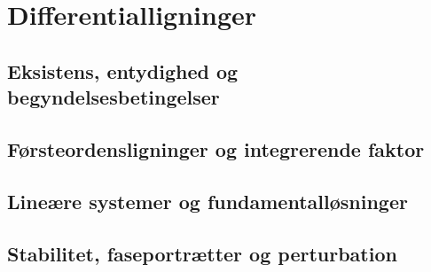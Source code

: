 \chapter{Differentialligninger}
\section{Eksistens, entydighed og begyndelsesbetingelser}
\leavevmode\par

\section{Førsteordensligninger og integrerende faktor}
\leavevmode\par

\section{Lineære systemer og fundamentalløsninger}
\leavevmode\par

\section{Stabilitet, faseportrætter og perturbation}
\leavevmode\par
